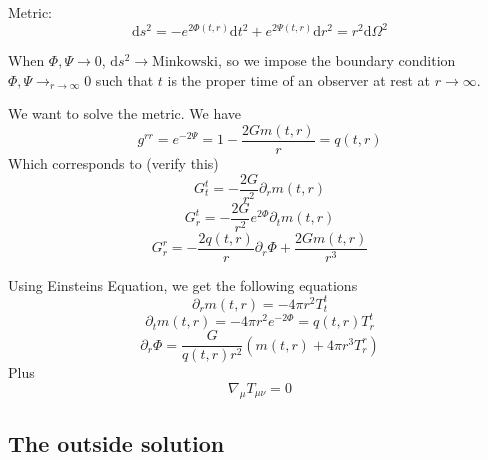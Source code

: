 \documentclass[a4paper]{book}
\theoremstyle{definition}
\theoremstyle{remark}
\begin{document}
\noindent Metric:
\begin{equation}
    \text{d}s^2 = -e^{2\Phi(t, r)} \text{d}t^2 + e^{2\Psi(t, r)}\text{d}r^2 = r^2 \text{d}\Omega^2
\end{equation}

When $\Phi, \Psi \rightarrow 0$, $\text{d}s^2 \rightarrow \text{Minkowski}$, so we impose the boundary condition $\Phi, \Psi \rightarrow_{r\rightarrow \infty} 0$ such that $t$ is the proper time of an observer at rest at $r\rightarrow \infty$.\par \medskip 

We want to solve the metric. We have 
\begin{equation}
    g^{rr} = e^{-2\Psi} = 1-\frac{2G m(t, r)}{r} = q(t, r)
\end{equation}
Which corresponds to (verify this)
\begin{equation}
    G^t_t = -\frac{2G}{r^2} \partial_r m(t, r)
\end{equation}
\begin{equation}
    G^t_r = - \frac{2G}{r^2} e^{2\Phi}\partial_t m(t, r)
\end{equation}
\begin{equation}
    G^r_r = -\frac{2q(t,r)}{r}\partial_r \Phi + \frac{2Gm(t, r)}{r^3}
\end{equation}

Using Einsteins Equation, we get the following equations
\begin{equation}
    \partial_r m(t, r) = -4\pi r^2 T^t_t
\label{eq:rsym1}\end{equation}
\begin{equation}
    \partial_t m(t, r) = -4\pi r^2 e^{-2\Phi} = q(t, r)T^t_r
\label{eq:rsym2}\end{equation}
\begin{equation}
    \partial_r \Phi = \frac{G}{q(t, r)r^2}\left(m(t, r) + 4\pi r^3 T^r_r\right)
\label{eq:rsym3}\end{equation}
Plus 
\begin{equation}
    \nabla_\mu T_{\mu\nu} = 0
\end{equation}

\subsection{The outside solution}
\end{document}
